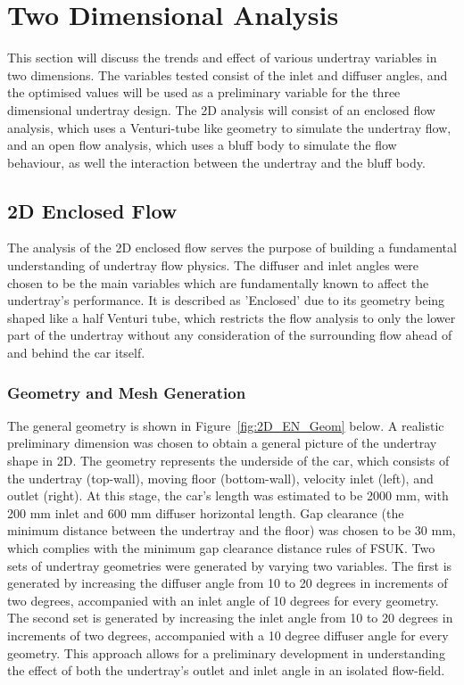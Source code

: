 
\section{Two Dimensional Analysis}
This section will discuss the trends and effect of various undertray variables in two dimensions. The variables tested consist of the inlet and diffuser angles, and the optimised values will be used as a preliminary variable for the three dimensional undertray design. The 2D analysis will consist of an enclosed flow analysis, which uses a Venturi-tube like geometry to simulate the undertray flow, and an open flow analysis, which uses a bluff body to simulate the flow behaviour, as well the interaction between the undertray and the bluff body. 

\subsection{2D Enclosed Flow}
The analysis of the 2D enclosed flow serves the purpose of building a fundamental understanding of undertray flow physics. The diffuser and inlet angles were chosen to be the main variables which are fundamentally known to affect the undertray's performance. It is described as 'Enclosed' due to its geometry being shaped like a half Venturi tube, which restricts the flow analysis to only the lower part of the undertray without any consideration of the surrounding flow ahead of and behind the car itself. 

\subsubsection{Geometry and Mesh Generation}
\noindent The general geometry is shown in Figure~\ref{fig:2D_EN_Geom} below. A realistic preliminary dimension was chosen to obtain a general picture of the undertray shape in 2D. The geometry represents the underside of the car, which consists of the undertray (top-wall), moving floor (bottom-wall), velocity inlet (left), and outlet (right). At this stage, the car's length was estimated to be 2000 mm, with 200 mm inlet and 600 mm diffuser horizontal length. Gap clearance (the minimum distance between the undertray and the floor) was chosen to be 30 mm, which complies with the minimum gap clearance distance rules of FSUK. Two sets of undertray geometries were generated by varying two variables. The first is generated by increasing the diffuser angle from 10 to 20 degrees in increments of two degrees, accompanied with an inlet angle of 10 degrees for every geometry. The second set is generated by increasing the inlet angle from 10 to 20 degrees in increments of two degrees, accompanied with a 10 degree diffuser angle for every geometry. This approach allows for a preliminary development in understanding the effect of both the undertray's outlet and inlet angle in an isolated flow-field. 

